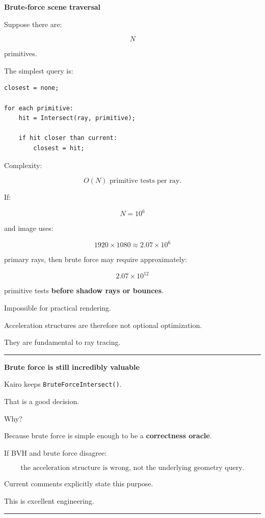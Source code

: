 \textbf{Brute-force scene traversal}

Suppose there are:

\[
N
\]

primitives.

The simplest query is:

\begin{verbatim}
closest = none;

for each primitive:
    hit = Intersect(ray, primitive);

    if hit closer than current:
        closest = hit;
\end{verbatim}

Complexity:

\[
\boxed{O(N)\text{ primitive tests per ray}.}
\]

If:

\[
N=10^6
\]

and image uses:

\[
1920\times1080
\approx2.07\times10^6
\]

primary rays, then brute force may require approximately:

\[
2.07\times10^{12}
\]

primitive tests \textbf{before shadow rays or bounces}.

Impossible for practical rendering.

Acceleration structures are therefore not optional optimization.

They are fundamental to ray tracing.

\begin{center}\rule{0.5\linewidth}{0.5pt}\end{center}

\textbf{Brute force is still incredibly valuable}

Kairo keeps \texttt{BruteForceIntersect()}.

That is a good decision.

Why?

Because brute force is simple enough to be a \textbf{correctness oracle}.

If BVH and brute force disagree:

\[
\boxed{
\text{the acceleration structure is wrong, not the underlying geometry query}.
}
\]

Current comments explicitly state this purpose.

This is excellent engineering.

\begin{center}\rule{0.5\linewidth}{0.5pt}\end{center}

